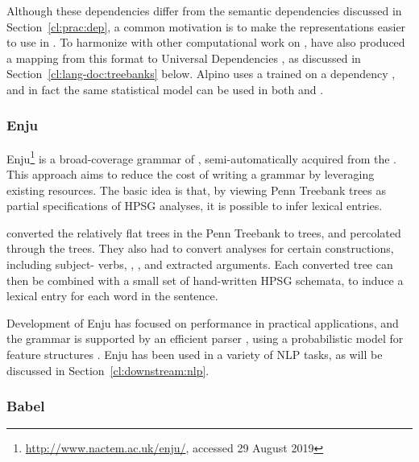 \documentclass[output=paper,nonflat]{langsci/langscibook}
\begin{document}
Although these dependencies differ from the semantic dependencies discussed in Section~\ref{cl:prac:dep},
a common motivation is to make the representations easier to use in .
To harmonize with other computational work on ,
\citet{Bou:Van:17} have also produced a mapping from this format
to Universal Dependencies \citep[UD;][]{Niv:Mar:Gin:16},
as discussed in Section~\ref{cl:lang-doc:treebanks} below.
Alpino uses a  trained on a dependency ,
and in fact the same statistical model can be used in both  and 
\citep{dekok2011reversible}.

\subsubsection{Enju}
\label{cl:other:enju}


Enju\footnote{%
	\url{http://www.nactem.ac.uk/enju/}, accessed 29 August 2019
} \citep{MNT2005a-u}
is a broad-coverage grammar of ,
semi-automatically acquired from the  \citep{Mar:San:Mar:93}.
This approach aims to reduce the cost of writing a grammar
by leveraging existing resources.
The basic idea is that, by viewing Penn Treebank trees as partial specifications of HPSG analyses,
it is possible to infer lexical entries.

\citeauthor{MNT2005a-u} converted the relatively flat trees in the Penn Treebank to  trees,
and percolated  through the trees.
They also had to convert analyses for certain constructions,
including subject- verbs, , , and extracted arguments.
Each converted tree can then be combined with a small set of hand-written HPSG schemata,
to induce a lexical entry for each word in the sentence.

Development of Enju has focused on performance in practical applications,
and the grammar is supported by an efficient parser \citep{tsuruoka2004enju,matsuzaki2007supertag},
using a probabilistic model for feature structures \citep{MT2008a-u}.
Enju has been used in a variety of NLP tasks, as will be discussed in Section~\ref{cl:downstream:nlp}.

\subsubsection{Babel}
\label{cl:other:babel}
\end{document}
